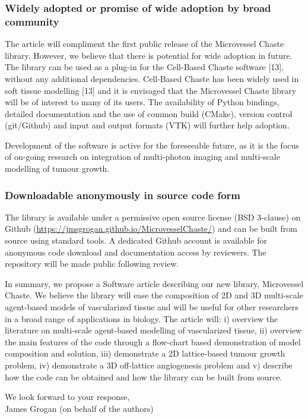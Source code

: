 \documentclass[fullpage,11pt]{article}
\begin{document}
\subsubsection*{Widely adopted or promise of wide adoption by broad community}
The article will compliment the first public release of the Microvessel Chaste library. However, we believe that there is potential for wide adoption in future. The library can be used as a plug-in for the Cell-Based Chaste software [13], without any additional dependencies. Cell-Based Chaste has been widely used in soft tissue modelling [13] and it is envisaged that the Microvessel Chaste library will be of interest to many of its users. The availability of Python bindings, detailed documentation and the use of common build (CMake), version control (git/Github) and input and output formats (VTK) will further help adoption. 

Development of the software is active for the foreseeable future, as it is the focus of on-going research on integration of multi-photon imaging and multi-scale modelling of tumour growth.

\subsubsection*{Downloadable anonymously in source code form}
The library is available under a permissive open source license (BSD 3-clause) on Github (\url{https://jmsgrogan.github.io/MicrovesselChaste/}) and can be built from source using standard tools. A dedicated Github account is available for anonymous code download and documentation access by reviewers. The repository will be made public following review.

In summary, we propose a Software article describing our new library, Microvessel Chaste. We believe the library will ease the composition of 2D and 3D multi-scale agent-based models of vascularized tissue and will be useful for other researchers in a broad range of applications in biology. The article will: i) overview the literature on multi-scale agent-based modelling of vascularized tissue, ii) overview the main features of the code through a flow-chart based demonstration of model composition and solution, iii) demonstrate a 2D lattice-based tumour growth problem, iv) demonstrate a 3D off-lattice angiogenesis problem and v) describe how the code can be obtained and how the library can be built from source.

\noindent We look forward to your response, \\ James Grogan (on behalf of the authors)\\
\end{document}
